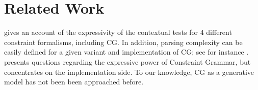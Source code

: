 \documentclass[11pt]{article}
\begin{document}
\section{Related Work}
 gives an account of the expressivity of
the contextual tests for 4 different constraint formalisms, including CG. 
In addition, parsing complexity can be easily defined for a given variant and 
implementation of CG; see for instance .
\cite{ylijyra2017} presents questions regarding the expressive power
of Constraint Grammar, but concentrates on the implementation side.
To our knowledge, CG as a generative model has not been been approached before.



\end{document}
